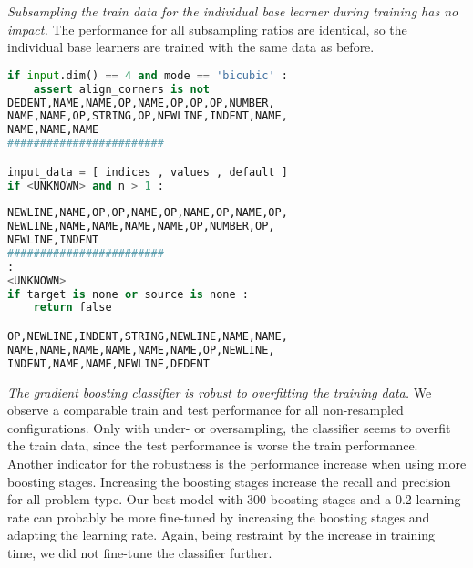\textit{Subsampling the train data for the individual base learner during training has no impact.} The performance for all subsampling ratios are identical, so the individual base learners are trained with the same data as before.


\begin{lstlisting}[float=h, language=Python, label=lst:gbc_false_positive, caption={False-positive samples for the best performing random forest classifier with 300 boosting stages, a learning rate of 0.2, type encoding and without resampling for the CCS type. We removed spaces between tokens if necessary, but leave the intendation as in the sample.}]
    if input.dim() == 4 and mode == 'bicubic' : 
    assert align_corners is not
DEDENT,NAME,NAME,OP,NAME,OP,OP,OP,NUMBER,
NAME,NAME,OP,STRING,OP,NEWLINE,INDENT,NAME,
NAME,NAME,NAME
########################

input_data = [ indices , values , default ] 
if <UNKNOWN> and n > 1 : 
       
NEWLINE,NAME,OP,OP,NAME,OP,NAME,OP,NAME,OP,
NEWLINE,NAME,NAME,NAME,NAME,OP,NUMBER,OP,
NEWLINE,INDENT
########################
: 
<UNKNOWN> 
if target is none or source is none : 
    return false 

OP,NEWLINE,INDENT,STRING,NEWLINE,NAME,NAME,
NAME,NAME,NAME,NAME,NAME,NAME,OP,NEWLINE,
INDENT,NAME,NAME,NEWLINE,DEDENT
\end{lstlisting}

\textit{The gradient boosting classifier is robust to overfitting the training data.} We observe a comparable train and test performance for all non-resampled configurations. Only with under- or oversampling, the classifier seems to overfit the train data, since the test performance is worse the train performance. 
Another indicator for the robustness is the performance increase when using more boosting stages. Increasing the boosting stages increase the recall and precision for all problem type. Our best model with 300 boosting stages and a 0.2 learning rate can probably be more fine-tuned by increasing the boosting stages and adapting the learning rate. Again, being restraint by the increase in training time, we did not fine-tune the classifier further.

\begin{center}
\end{center}


